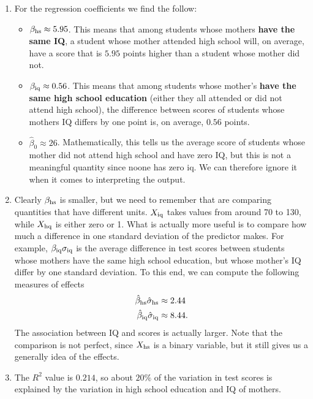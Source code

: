 \begin{itemize}
\begin{example}
\begin{Verbatim}
\end{Verbatim}
\vspace{1cm}
\begin{enumerate}[label=(\alph*)]
\item For the regression coefficients we find the follow:
\begin{itemize}
\item $\beta_{\rm hs} \approx 5.95$. This means that among students whose mothers {\bf have the same IQ}, a student whose mother attended high school will, on average, have a score that is $5.95$ points higher than a student whose mother did not. 
\item $\beta_{\rm iq} \approx 0.56$. This means that among students whose mother's {\bf have the same high school education} (either they all attended or did not attend high school), the difference between scores of students whose mothers IQ differs by one point is, on average, $0.56$ points.
\item $\hat{\beta}_0 \approx 26$. Mathematically, this tells us the average score of students whose mother did not attend high school and have zero IQ, but this is not a meaningful quantity since noone has zero iq. We can therefore ignore it when it comes to interpreting the output. 
\end{itemize}
\item Clearly $\beta_{\rm hs}$ is smaller, but we need to remember that are comparing quantities that have different units. $X_{\rm iq}$ takes values from around 70 to 130, while $X_{\rm hq}$ is either zero or 1. What is actually more useful is to compare how much a difference in one standard deviation of the predictor makes. For example, $\beta_{\rm iq}\sigma_{\rm iq}$ is the average difference in test scores between students whose mothers have the same high school education, but whose mother's IQ differ by one standard deviation. To this end, we can compute the following measures of effects
\begin{align*}
\hat{\beta}_{\rm hs}\hat{\sigma}_{\rm hs} &\approx 2.44\\
\hat{\beta}_{\rm iq}\hat{\sigma}_{\rm iq} &\approx 8.44.
\end{align*}
The association between IQ and scores is actually larger. Note that the comparison is not perfect, since $X_{\rm hs}$ is a binary variable, but it still gives us a generally idea of the effects. \\
\item The $R^2$ value is $0.214$, so about $20\%$ of the variation in test scores is explained by the variation in high school education and IQ of mothers. 

\end{enumerate}
\end{example}
\end{itemize}
